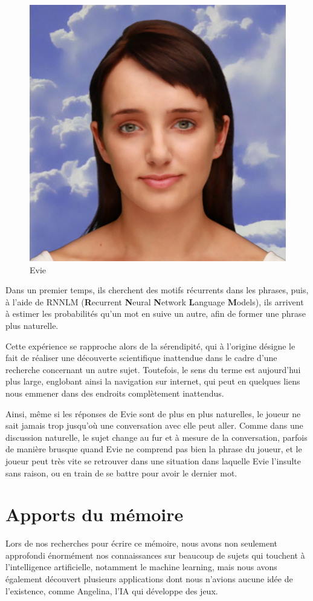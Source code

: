 \documentclass[a4paper, 12pt]{article} %
\begin{document}
\begin{figure}[!h]%
	\begin{center} 
		\includegraphics[width=0.40\columnwidth]{images/evie.png}%
		\caption{Evie}%
	\end{center}
\end{figure}

Dans un premier temps, ils cherchent  des motifs récurrents dans les phrases, puis, à l’aide de RNNLM (\textbf{R}ecurrent \textbf{N}eural \textbf{N}etwork \textbf{L}anguage \textbf{M}odels), ils arrivent à  estimer les probabilités qu'un mot en suive un autre, afin de former une phrase plus naturelle.

Cette expérience se rapproche alors de la sérendipité, qui à l'origine désigne le fait de réaliser une découverte scientifique inattendue dans le cadre d'une recherche concernant un autre sujet. Toutefois, le sens du terme est aujourd'hui plus large, englobant ainsi la navigation sur internet, qui peut en quelques liens nous emmener dans des endroits complètement inattendus.

Ainsi, même si les réponses de Evie sont de plus en plus naturelles, le joueur ne sait jamais trop jusqu'où une conversation avec elle peut aller. Comme dans une discussion naturelle, le sujet change au fur et à mesure de la conversation, parfois de manière brusque quand Evie ne comprend pas bien la phrase du joueur, et le joueur peut très vite se retrouver dans une situation dans laquelle Evie l'insulte sans raison, ou en train de se battre pour avoir le dernier mot.


\newpage
\section{Apports du mémoire}
Lors de nos recherches pour écrire ce mémoire, nous avons non seulement approfondi énormément nos connaissances sur beaucoup de sujets qui touchent à l'intelligence artificielle, notamment le machine learning, mais nous avons également découvert plusieurs applications dont nous n'avions aucune idée de l'existence, comme Angelina, l'IA qui développe des jeux.
\end{document}
